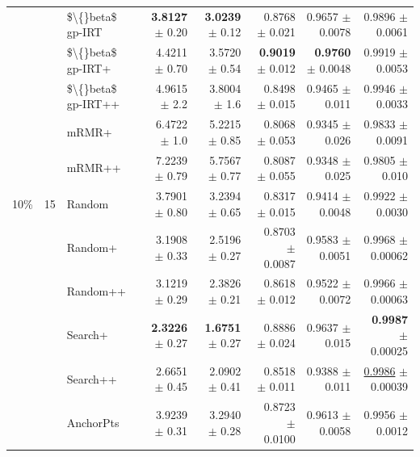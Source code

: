 \begin{longtable}{llp{}rrrrr}
 &  & \$\textbackslash\{\}beta\$ gp-IRT & \textbf{3.8127} {\scriptsize $\pm$ 0.20} & \textbf{3.0239} {\scriptsize $\pm$ 0.12} & 0.8768 {\scriptsize $\pm$ 0.021} & 0.9657 {\scriptsize $\pm$ 0.0078} & 0.9896 {\scriptsize $\pm$ 0.0061} \\
 &  & \$\textbackslash\{\}beta\$ gp-IRT+ & 4.4211 {\scriptsize $\pm$ 0.70} & 3.5720 {\scriptsize $\pm$ 0.54} & \textbf{0.9019} {\scriptsize $\pm$ 0.012} & \textbf{0.9760} {\scriptsize $\pm$ 0.0048} & 0.9919 {\scriptsize $\pm$ 0.0053} \\
 &  & \$\textbackslash\{\}beta\$ gp-IRT++ & 4.9615 {\scriptsize $\pm$ 2.2} & 3.8004 {\scriptsize $\pm$ 1.6} & 0.8498 {\scriptsize $\pm$ 0.015} & 0.9465 {\scriptsize $\pm$ 0.011} & 0.9946 {\scriptsize $\pm$ 0.0033} \\
 &  & mRMR+ & 6.4722 {\scriptsize $\pm$ 1.0} & 5.2215 {\scriptsize $\pm$ 0.85} & 0.8068 {\scriptsize $\pm$ 0.053} & 0.9345 {\scriptsize $\pm$ 0.026} & 0.9833 {\scriptsize $\pm$ 0.0091} \\
 &  & mRMR++ & 7.2239 {\scriptsize $\pm$ 0.79} & 5.7567 {\scriptsize $\pm$ 0.77} & 0.8087 {\scriptsize $\pm$ 0.055} & 0.9348 {\scriptsize $\pm$ 0.025} & 0.9805 {\scriptsize $\pm$ 0.010} \\
\midrule
10\% & 15 & Random & 3.7901 {\scriptsize $\pm$ 0.80} & 3.2394 {\scriptsize $\pm$ 0.65} & 0.8317 {\scriptsize $\pm$ 0.015} & 0.9414 {\scriptsize $\pm$ 0.0048} & 0.9922 {\scriptsize $\pm$ 0.0030} \\
 &  & Random+ & 3.1908 {\scriptsize $\pm$ 0.33} & 2.5196 {\scriptsize $\pm$ 0.27} & 0.8703 {\scriptsize $\pm$ 0.0087} & 0.9583 {\scriptsize $\pm$ 0.0051} & 0.9968 {\scriptsize $\pm$ 0.00062} \\
 &  & Random++ & 3.1219 {\scriptsize $\pm$ 0.29} & 2.3826 {\scriptsize $\pm$ 0.21} & 0.8618 {\scriptsize $\pm$ 0.012} & 0.9522 {\scriptsize $\pm$ 0.0072} & 0.9966 {\scriptsize $\pm$ 0.00063} \\
 &  & Search+ & \textbf{2.3226} {\scriptsize $\pm$ 0.27} & \textbf{1.6751} {\scriptsize $\pm$ 0.27} & 0.8886 {\scriptsize $\pm$ 0.024} & 0.9637 {\scriptsize $\pm$ 0.015} & \textbf{0.9987} {\scriptsize $\pm$ 0.00025} \\
 &  & Search++ & 2.6651 {\scriptsize $\pm$ 0.45} & 2.0902 {\scriptsize $\pm$ 0.41} & 0.8518 {\scriptsize $\pm$ 0.011} & 0.9388 {\scriptsize $\pm$ 0.011} & \underline{0.9986} {\scriptsize $\pm$ 0.00039} \\
 &  & AnchorPts & 3.9239 {\scriptsize $\pm$ 0.31} & 3.2940 {\scriptsize $\pm$ 0.28} & 0.8723 {\scriptsize $\pm$ 0.0100} & 0.9613 {\scriptsize $\pm$ 0.0058} & 0.9956 {\scriptsize $\pm$ 0.0012} \\

\end{longtable}

